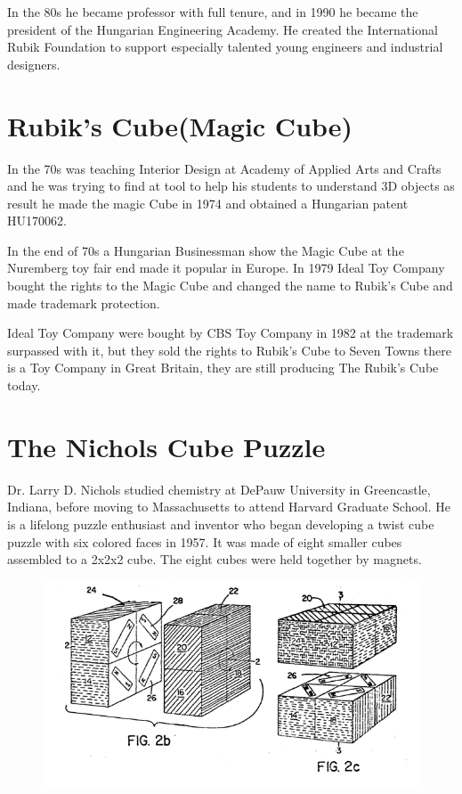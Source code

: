 In the 80s he became professor with full tenure, and in 1990 he became the president of the Hungarian Engineering Academy. He created the International Rubik Foundation to support especially talented young engineers and industrial designers.
 
\section{Rubik's Cube(Magic Cube)}

 In the 70s \erno{} was teaching Interior Design at Academy of Applied Arts and Crafts and he was trying to find at tool to help his students to understand 3D objects as result he made the magic Cube in 1974 and obtained a Hungarian patent HU170062.

In the end of 70s a Hungarian Businessman show the Magic Cube at the Nuremberg toy fair end made it popular in Europe. In 1979 Ideal Toy Company bought the rights to the Magic Cube and changed the name to Rubik's Cube and made trademark protection. 

Ideal Toy Company were bought by CBS Toy Company in 1982 at the trademark surpassed with it, but they sold the rights to Rubik's Cube to Seven Towns there is a Toy Company in Great Britain, they are still producing  The Rubik's Cube today.


 
\section{The Nichols Cube Puzzle}
Dr. Larry D. Nichols studied chemistry at DePauw University in Greencastle, Indiana, before moving to Massachusetts to attend Harvard Graduate School. 
He is a lifelong puzzle enthusiast and inventor who  began developing a twist cube puzzle with six colored faces in 1957. It was made of eight smaller cubes assembled to a 2x2x2 cube. The eight cubes were held together by magnets.

\begin{figure}[H]
\begin{center}
\includegraphics[scale=0.8]{input/pics/Nicholspatent2.png}
\caption{}
\label{fig:Nicholspatent}
\end{center}
\end{figure}

